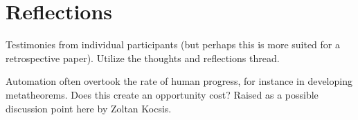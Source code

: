 \section{Reflections}


Testimonies from individual participants (but perhaps this is more suited for a retrospective paper). Utilize the thoughts and reflections thread.

Automation often overtook the rate of human progress, for instance in developing metatheorems. Does this create an opportunity cost? Raised as a possible discussion point here by Zoltan Kocsis.
